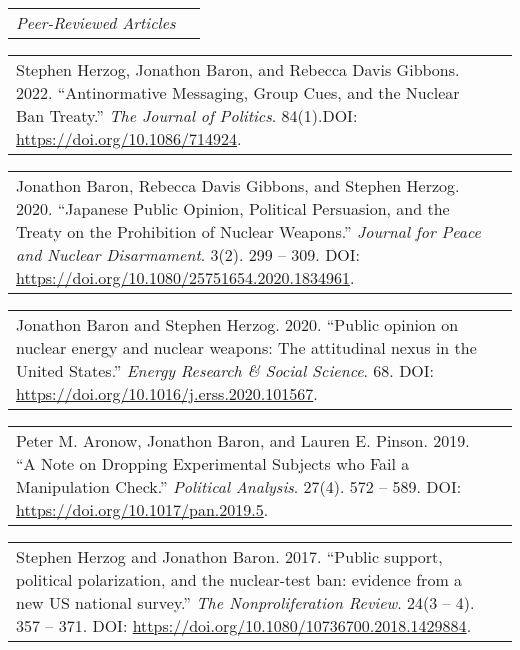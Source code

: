 \documentclass[11pt]{article}
\begin{document}
\vspace{0.13in}

\begin{tabular*}{7.1in}{p{6.925in}p{3cm}}
{\large {\emph{Peer-Reviewed Articles}}}
\end{tabular*} 

\vspace{0.13in}

\begin{tabular*}{7.1in}{p{6.925in}p{3cm}}
Stephen Herzog, Jonathon Baron, and Rebecca Davis Gibbons. 2022. ``Antinormative Messaging, Group Cues, and the Nuclear Ban Treaty.'' \textit{The Journal of Politics}. 84(1).DOI: \url{https://doi.org/10.1086/714924}.
\end{tabular*}

\vspace{0.13in}

\begin{tabular*}{7.1in}{p{6.925in}p{3cm}}
Jonathon Baron, Rebecca Davis Gibbons, and Stephen Herzog. 2020. ``Japanese Public Opinion, Political Persuasion, and the Treaty on the Prohibition of Nuclear Weapons.'' \textit{Journal for Peace and Nuclear Disarmament}. 3(2). 299 -- 309. DOI: \url{https://doi.org/10.1080/25751654.2020.1834961}.
\end{tabular*}

\vspace{0.13in}

\begin{tabular*}{7.1in}{p{6.925in}p{3cm}}
Jonathon Baron and Stephen Herzog. 2020. ``Public opinion on nuclear energy and nuclear weapons: The attitudinal nexus in the United States.'' \textit{Energy Research \& Social Science}. 68. DOI: \url{https://doi.org/10.1016/j.erss.2020.101567}.
\end{tabular*}

\vspace{0.13in}

\begin{tabular*}{7.1in}{p{6.925in}p{3cm}}
Peter M. Aronow, Jonathon Baron, and Lauren E. Pinson. 2019. ``A Note on Dropping Experimental Subjects who Fail a Manipulation Check.'' \textit{Political Analysis}. 27(4). 572 -- 589. DOI: \url{https://doi.org/10.1017/pan.2019.5}.
\end{tabular*}

\vspace{0.13in}

\begin{tabular*}{7.1in}{p{6.925in}p{3cm}}
Stephen Herzog and Jonathon Baron. 2017. ``Public support, political polarization, and the nuclear-test ban: evidence from a new US national survey.'' {\it The Nonproliferation Review}. 24(3 -- 4). 357 -- 371. DOI: \url{https://doi.org/10.1080/10736700.2018.1429884}.
\end{tabular*}
\end{document}
